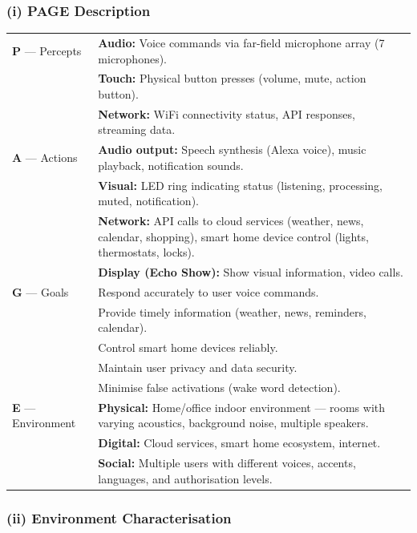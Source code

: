 \documentclass[12pt, a4paper]{article}
\begin{document}
\subsubsection*{(i) PAGE Description}

\begin{center}
\renewcommand{\arraystretch}{1.5}
\begin{tabular}{l|p{13cm}}
\toprule
\textbf{P} — Percepts &
\textbf{Audio:} Voice commands via far-field microphone array (7 microphones).\\
& \textbf{Touch:} Physical button presses (volume, mute, action button).\\
& \textbf{Network:} WiFi connectivity status, API responses, streaming data.\\
\midrule
\textbf{A} — Actions &
\textbf{Audio output:} Speech synthesis (Alexa voice), music playback, notification sounds.\\
& \textbf{Visual:} LED ring indicating status (listening, processing, muted, notification).\\
& \textbf{Network:} API calls to cloud services (weather, news, calendar, shopping), smart home device control (lights, thermostats, locks).\\
& \textbf{Display (Echo Show):} Show visual information, video calls.\\
\midrule
\textbf{G} — Goals &
Respond accurately to user voice commands.\\
& Provide timely information (weather, news, reminders, calendar).\\
& Control smart home devices reliably.\\
& Maintain user privacy and data security.\\
& Minimise false activations (wake word detection).\\
\midrule
\textbf{E} — Environment &
\textbf{Physical:} Home/office indoor environment — rooms with varying acoustics, background noise, multiple speakers.\\
& \textbf{Digital:} Cloud services, smart home ecosystem, internet.\\
& \textbf{Social:} Multiple users with different voices, accents, languages, and authorisation levels.\\
\bottomrule
\end{tabular}
\end{center}

\subsubsection*{(ii) Environment Characterisation}
\end{document}
